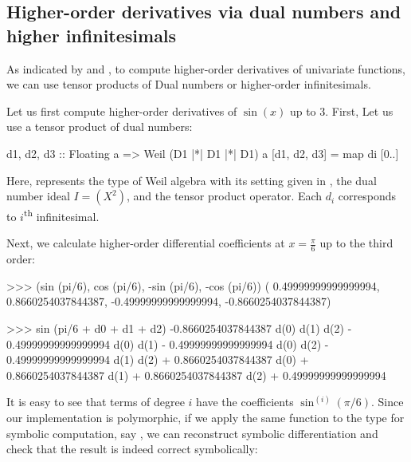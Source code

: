 \subsection{Higher-order derivatives via dual numbers and higher infinitesimals}
As indicated by  and ,
to compute higher-order derivatives of univariate functions, we can use tensor products of Dual numbers or higher-order infinitesimals.

Let us first compute higher-order derivatives of $\sin(x)$ up to $3$.
First, Let us use a tensor product of dual numbers:
\begin{code}
d1, d2, d3 :: Floating a => Weil (D1 |*| D1 |*| D1) a
[d1, d2, d3] = map di [0..]
\end{code}
Here,  represents the type of Weil algebra with its setting given in ,  the dual number ideal $I = (X^2)$, and \hask{|*|} the tensor product operator.
Each $d_i$ corresponds to $i$\textsuperscript{th} infinitesimal.

Next, we calculate higher-order differential coefficients at $x = \frac{\pi}{6}$ up to the third order:

\begin{repl}
>>> (sin (pi/6),  cos (pi/6), -sin (pi/6), -cos (pi/6))
( 0.49999999999999994, 0.8660254037844387, -0.49999999999999994,
  -0.8660254037844387)

>>> sin (pi/6 + d0 + d1 + d2)
-0.8660254037844387 d(0) d(1) d(2) - 0.49999999999999994 d(0) d(1) 
  - 0.49999999999999994 d(0) d(2)  - 0.49999999999999994 d(1) d(2) 
  + 0.8660254037844387 d(0) + 0.8660254037844387 d(1) 
  + 0.8660254037844387 d(2) + 0.49999999999999994
\end{repl}

It is easy to see that terms of degree $i$ have the coefficients $\sin^{(i)}(\pi/6)$.
Since our implementation is polymorphic, if we apply the same function to the type for symbolic computation, say , we can reconstruct symbolic differentiation and check that the result is indeed correct symbolically:


